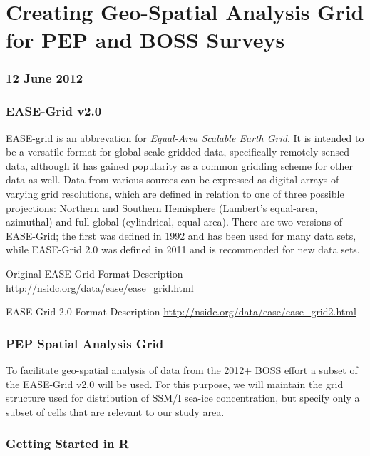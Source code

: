 \documentclass[]{article}
\begin{document}
\section{Creating Geo-Spatial Analysis Grid for PEP and BOSS Surveys}

\subsubsection{12 June 2012}

\subsubsection{EASE-Grid v2.0}

EASE-grid is an abbrevation for \emph{Equal-Area Scalable Earth Grid}.
It is intended to be a versatile format for global-scale gridded data,
specifically remotely sensed data, although it has gained popularity as
a common gridding scheme for other data as well. Data from various
sources can be expressed as digital arrays of varying grid resolutions,
which are defined in relation to one of three possible projections:
Northern and Southern Hemisphere (Lambert's equal-area, azimuthal) and
full global (cylindrical, equal-area). There are two versions of
EASE-Grid; the first was defined in 1992 and has been used for many data
sets, while EASE-Grid 2.0 was defined in 2011 and is recommended for new
data sets.

Original EASE-Grid Format Description
\href{http://nsidc.org/data/ease/ease\_grid.html}{http://nsidc.org/data/ease/ease\_grid.html}

EASE-Grid 2.0 Format Description
\href{http://nsidc.org/data/ease/ease\_grid2.html}{http://nsidc.org/data/ease/ease\_grid2.html}

\subsubsection{PEP Spatial Analysis Grid}

To facilitate geo-spatial analysis of data from the 2012+ BOSS effort a
subset of the EASE-Grid v2.0 will be used. For this purpose, we will
maintain the grid structure used for distribution of SSM/I sea-ice
concentration, but specify only a subset of cells that are relevant to
our study area.

\subsubsection{Getting Started in R}
\end{document}
